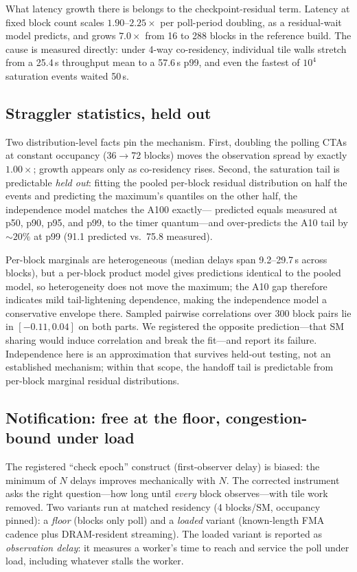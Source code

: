 \documentclass[11pt]{article}
\newcommand{\us}{\,\textmu s\xspace}
\begin{document}
What latency growth there is belongs to the checkpoint-residual
term. Latency at fixed block count scales $1.90$--$2.25\times$ per
poll-period doubling, as a residual-wait model predicts, and grows
$7.0\times$ from 16 to 288 blocks in the reference build. The cause
is measured directly: under 4-way co-residency, individual tile walls
stretch from a 25.4\us{} throughput mean to a 57.6\us{} p99, and even
the fastest of $10^4$ saturation events waited 50\us.

\subsection{Straggler statistics, held out}
\label{sec:heldout}

Two distribution-level facts pin the mechanism. First, doubling the
polling CTAs at constant occupancy (36${\to}$72 blocks) moves the
observation spread by exactly $1.00\times$; growth appears only as
co-residency rises. Second, the saturation tail is predictable
\emph{held out}: fitting the pooled per-block residual distribution
on half the events and predicting the maximum's quantiles on the
other half, the independence model matches the A100 exactly---
predicted equals measured at p50, p90, p95, and p99, to the timer
quantum---and over-predicts the A10 tail by ${\sim}20\%$ at p99
(91.1 predicted vs.\ 75.8 measured).

Per-block marginals are heterogeneous (median delays span
9.2--29.7\us{} across blocks), but a per-block product model gives
predictions identical to the pooled model, so heterogeneity does not
move the maximum; the A10 gap therefore indicates mild
tail-lightening dependence, making the independence model a
conservative envelope there. Sampled pairwise correlations over 300
block pairs lie in $[-0.11, 0.04]$ on both parts. We registered the
opposite prediction---that SM sharing would induce correlation and
break the fit---and report its failure. Independence here is an
approximation that survives held-out testing, not an established
mechanism; within that scope, the handoff tail is predictable from
per-block marginal residual distributions.

\subsection{Notification: free at the floor, congestion-bound under
load}
\label{sec:visibility}

The registered ``check epoch'' construct (first-observer delay) is
biased: the minimum of $N$ delays improves mechanically with $N$. The
corrected instrument asks the right question---how long until
\emph{every} block observes---with tile work removed. Two variants
run at matched residency (4 blocks/SM, occupancy pinned): a
\emph{floor} (blocks only poll) and a \emph{loaded} variant
(known-length FMA cadence plus DRAM-resident streaming). The loaded
variant is reported as \emph{observation delay}: it measures a
worker's time to reach and service the poll under load, including
whatever stalls the worker.
\end{document}
